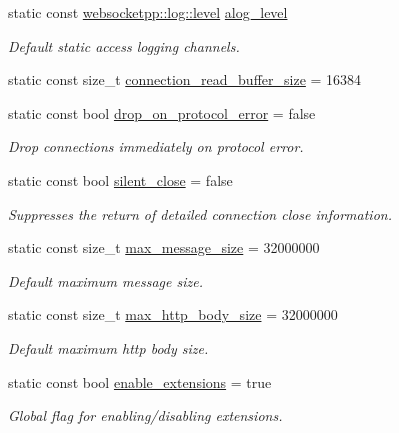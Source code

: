 \begin{DoxyCompactItemize}
static const \hyperlink{namespacewebsocketpp_1_1log_a12d4d17939f102db8c9183d400a41960}{websocketpp\+::log\+::level} \hyperlink{structwebsocketpp_1_1config_1_1debug__core_afed6fcfe2f8950b959713c7459e3645c}{alog\+\_\+level}
\begin{DoxyCompactList}\small\item\em Default static access logging channels. \end{DoxyCompactList}\item 
static const size\+\_\+t \hyperlink{structwebsocketpp_1_1config_1_1debug__core_a7980b627f735f03d4e48d39d949dcb0a}{connection\+\_\+read\+\_\+buffer\+\_\+size} = 16384
\item 
static const bool \hyperlink{structwebsocketpp_1_1config_1_1debug__core_a0f046a730b161555c644dc40df9ea870}{drop\+\_\+on\+\_\+protocol\+\_\+error} = false
\begin{DoxyCompactList}\small\item\em Drop connections immediately on protocol error. \end{DoxyCompactList}\item 
static const bool \hyperlink{structwebsocketpp_1_1config_1_1debug__core_a961630bca024033059ef50863d1fc174}{silent\+\_\+close} = false
\begin{DoxyCompactList}\small\item\em Suppresses the return of detailed connection close information. \end{DoxyCompactList}\item 
static const size\+\_\+t \hyperlink{structwebsocketpp_1_1config_1_1debug__core_a2c46fa8d65f3a6a69ccec42bd0e91e20}{max\+\_\+message\+\_\+size} = 32000000
\begin{DoxyCompactList}\small\item\em Default maximum message size. \end{DoxyCompactList}\item 
static const size\+\_\+t \hyperlink{structwebsocketpp_1_1config_1_1debug__core_a95ea7d50bc0617bc447d98dca1ea7e0d}{max\+\_\+http\+\_\+body\+\_\+size} = 32000000
\begin{DoxyCompactList}\small\item\em Default maximum http body size. \end{DoxyCompactList}\item 
static const bool \hyperlink{structwebsocketpp_1_1config_1_1debug__core_a483b9b5f8929dddf7389f6a751400406}{enable\+\_\+extensions} = true
\begin{DoxyCompactList}\small\item\em Global flag for enabling/disabling extensions. \end{DoxyCompactList}\end{DoxyCompactItemize}



